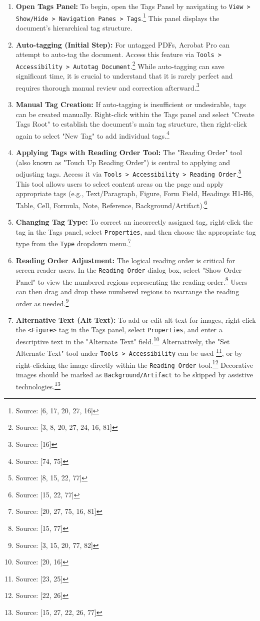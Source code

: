 \begin{enumerate}[noitemsep,topsep=0pt]
    \item \textbf{Open Tags Panel:} To begin, open the Tags Panel by navigating to \texttt{View > Show/Hide > Navigation Panes > Tags}.\footnote{Source: [6, 17, 20, 27, 16]} This panel displays the document's hierarchical tag structure.
    \item \textbf{Auto-tagging (Initial Step):} For untagged PDFs, Acrobat Pro can attempt to auto-tag the document. Access this feature via \texttt{Tools > Accessibility > Autotag Document}.\footnote{Source: [3, 8, 20, 27, 24, 16, 81]} While auto-tagging can save significant time, it is crucial to understand that it is rarely perfect and requires thorough manual review and correction afterward.\footnote{Source: [16]}
    \item \textbf{Manual Tag Creation:} If auto-tagging is insufficient or undesirable, tags can be created manually. Right-click within the Tags panel and select "Create Tags Root" to establish the document's main tag structure, then right-click again to select "New Tag" to add individual tags.\footnote{Source: [74, 75]}
    \item \textbf{Applying Tags with Reading Order Tool:} The "Reading Order" tool (also known as "Touch Up Reading Order") is central to applying and adjusting tags. Access it via \texttt{Tools > Accessibility > Reading Order}.\footnote{Source: [8, 15, 22, 77]} This tool allows users to select content areas on the page and apply appropriate tags (e.g., Text/Paragraph, Figure, Form Field, Headings H1-H6, Table, Cell, Formula, Note, Reference, Background/Artifact).\footnote{Source: [15, 22, 77]}
    \item \textbf{Changing Tag Type:} To correct an incorrectly assigned tag, right-click the tag in the Tags panel, select \texttt{Properties}, and then choose the appropriate tag type from the \texttt{Type} dropdown menu.\footnote{Source: [20, 27, 75, 16, 81]}
    \item \textbf{Reading Order Adjustment:} The logical reading order is critical for screen reader users. In the \texttt{Reading Order} dialog box, select "Show Order Panel" to view the numbered regions representing the reading order.\footnote{Source: [15, 77]} Users can then drag and drop these numbered regions to rearrange the reading order as needed.\footnote{Source: [3, 15, 20, 77, 82]}
    \item \textbf{Alternative Text (Alt Text):} To add or edit alt text for images, right-click the \texttt{<Figure>} tag in the Tags panel, select \texttt{Properties}, and enter a descriptive text in the "Alternate Text" field.\footnote{Source: [20, 16]} Alternatively, the "Set Alternate Text" tool under \texttt{Tools > Accessibility} can be used \footnote{Source: [23, 25]}, or by right-clicking the image directly within the \texttt{Reading Order} tool.\footnote{Source: [22, 26]} Decorative images should be marked as \texttt{Background/Artifact} to be skipped by assistive technologies.\footnote{Source: [15, 27, 22, 26, 77]}

\end{enumerate}
